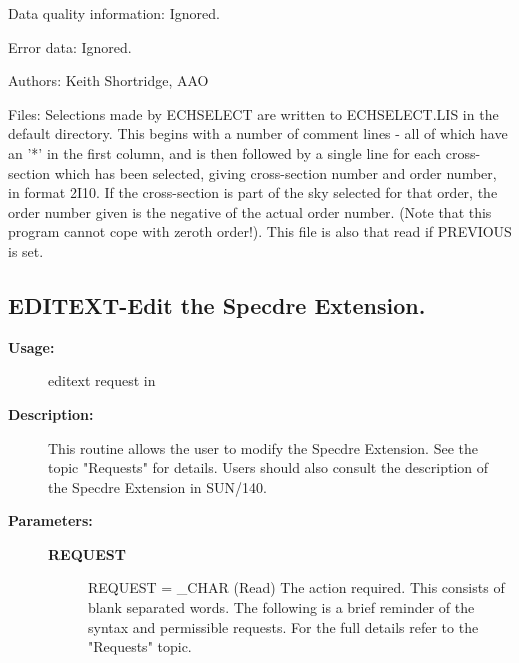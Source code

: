\begin{description}
\begin{description}
\begin{terminalv}
 Data quality information:  Ignored.

 Error data: Ignored.

 Authors: Keith Shortridge, AAO

 Files:
    Selections made by ECHSELECT are written to ECHSELECT.LIS in the
    default directory.  This begins with a number of comment lines -
    all of which have an '*' in the first column, and is then followed
    by a single line for each cross-section which has been selected,
    giving cross-section number and order number, in format 2I10.
    If the cross-section is part of the sky selected for that order,
    the order number given is the negative of the actual order number.
    (Note that this program cannot cope with zeroth order!).  This
    file is also that read if PREVIOUS is set.
\end{terminalv}
\end{description}
\subsection{EDITEXT-\label{EDITEXT}Edit the Specdre Extension.}
\begin{description}

\item [\textbf{Usage:}]

   editext request in


\item [\textbf{Description:}]

   This routine allows the user to modify the Specdre Extension. See
   the topic "Requests" for details. Users should also consult the
   description of the Specdre Extension in SUN/140.

\item [\textbf{Parameters:}]
\begin{description}
\item [\textbf{REQUEST}]
REQUEST = \_CHAR (Read)
   The action required. This consists of blank separated words.
   The following is a brief reminder of the syntax and permissible
   requests. For the full details refer to the "Requests" topic.


\end{description}
\end{description}
\end{description}
